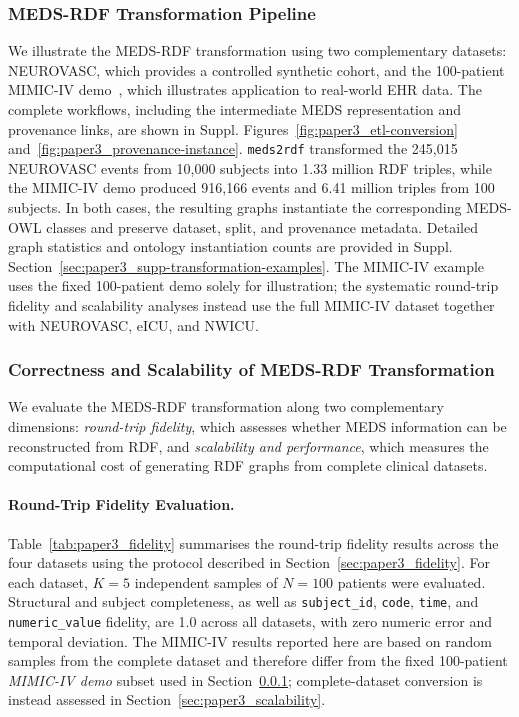 
\subsubsection{MEDS-RDF Transformation Pipeline}\label{sec:paper3_usage-examples}
We illustrate the MEDS-RDF transformation using two complementary datasets: NEUROVASC, which provides a controlled synthetic cohort, and the 100-patient MIMIC-IV demo~\cite{mcdermott_mimic-iv_2025}, which illustrates application to real-world EHR data. The complete workflows, including the intermediate MEDS representation and provenance links, are shown in Suppl. Figures~\ref{fig:paper3_etl-conversion} and~\ref{fig:paper3_provenance-instance}. \texttt{meds2rdf} transformed the 245,015 NEUROVASC events from 10,000 subjects into 1.33 million RDF triples, while the MIMIC-IV demo produced 916,166 events and 6.41 million triples from 100 subjects. In both cases, the resulting graphs instantiate the corresponding MEDS-OWL classes and preserve dataset, split, and provenance metadata. Detailed graph statistics and ontology instantiation counts are provided in Suppl. Section~\ref{sec:paper3_supp-transformation-examples}. The MIMIC-IV example uses the fixed 100-patient demo solely for illustration; the systematic round-trip fidelity and scalability analyses instead use the full MIMIC-IV dataset together with NEUROVASC, eICU, and NWICU.

\subsubsection{Correctness and Scalability of MEDS-RDF Transformation}\label{sec:paper3_evaluate-meds-rdf-conversion}
We evaluate the MEDS-RDF transformation along two complementary dimensions: \emph{round-trip fidelity}, which assesses whether MEDS information can be reconstructed from RDF, and \emph{scalability and performance}, which measures the computational cost of generating RDF graphs from complete clinical datasets.

\paragraph{Round-Trip Fidelity Evaluation.}
Table~\ref{tab:paper3_fidelity} summarises the round-trip fidelity results across the four datasets using the protocol described in Section~\ref{sec:paper3_fidelity}. For each dataset, $K=5$ independent samples of $N=100$ patients were evaluated. Structural and subject completeness, as well as \texttt{subject\_id}, \texttt{code}, \texttt{time}, and \texttt{numeric\_value} fidelity, are 1.0 across all datasets, with zero numeric error and temporal deviation. The MIMIC-IV results reported here are based on random samples from the complete dataset and therefore differ from the fixed 100-patient \emph{MIMIC-IV demo} subset used in Section~\ref{sec:paper3_usage-examples}; complete-dataset conversion is instead assessed in Section~\ref{sec:paper3_scalability}.

